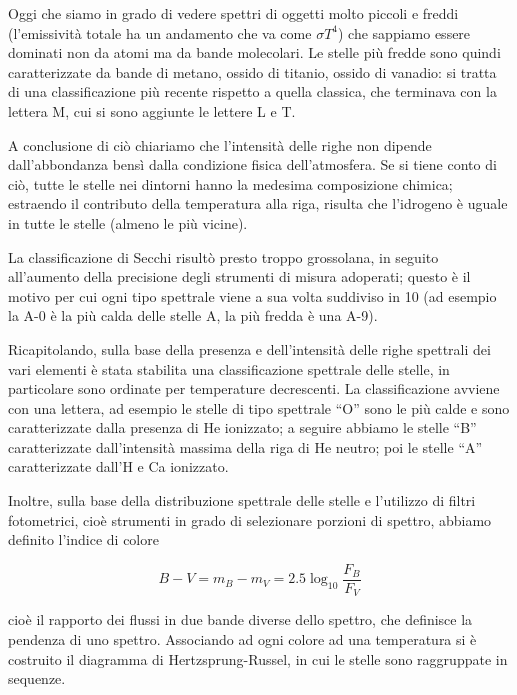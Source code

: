 Oggi che siamo in grado di vedere spettri di oggetti molto piccoli e freddi (l'emissività totale ha un andamento che va come ${\sigma}T^4$) che sappiamo essere dominati non da atomi ma da bande molecolari. Le stelle più fredde sono quindi caratterizzate da bande di metano, ossido di titanio, ossido di vanadio: si tratta di una classificazione più recente rispetto a quella classica, che terminava con la lettera M, cui si sono aggiunte le lettere L e T.

A conclusione di ciò chiariamo che l'intensità delle righe non dipende dall'abbondanza bensì dalla condizione fisica dell'atmosfera. Se si tiene conto di ciò, tutte le stelle nei dintorni hanno la medesima composizione chimica; estraendo il contributo della temperatura alla riga, risulta che l'idrogeno è uguale in tutte le stelle (almeno le più vicine).

La classificazione di Secchi risultò presto troppo grossolana, in seguito all'aumento della precisione degli strumenti di misura adoperati; questo è il motivo per cui ogni tipo spettrale viene a sua volta suddiviso in 10 (ad esempio la A-0 è la più calda delle stelle A, la più fredda è una A-9).



Ricapitolando, sulla base della presenza e dell'intensità delle righe spettrali dei vari elementi è stata stabilita una classificazione spettrale delle stelle, in particolare sono ordinate per temperature decrescenti. La classificazione avviene con una lettera, ad esempio le stelle di tipo spettrale “O” sono le più calde e sono caratterizzate dalla presenza di He ionizzato; a seguire abbiamo le stelle “B” caratterizzate dall'intensità massima della riga di He neutro; poi le stelle “A” caratterizzate dall'H e Ca ionizzato.

Inoltre, sulla base della distribuzione spettrale delle stelle e l'utilizzo di filtri fotometrici, cioè strumenti in grado di selezionare porzioni di spettro, abbiamo definito l'indice di colore

$$B-V=m_B-m_V=2.5\log_{10}{\frac{F_B}{F_V}}$$

cioè il rapporto dei flussi in due bande diverse dello spettro, che definisce la pendenza di uno spettro. Associando ad ogni colore ad una temperatura si è costruito il diagramma di Hertzsprung-Russel, in cui le stelle sono raggruppate in sequenze.








